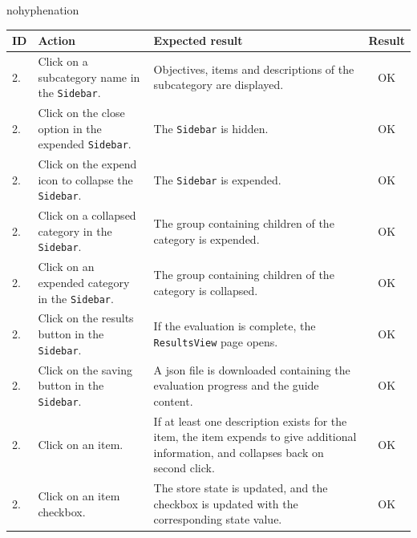 \begin{hyphenrules}{nohyphenation}
	\begin{table}[ht]
		\begin{center}
			\begin{tabularx}{\textwidth}{l|p{4cm}Xc}
				\toprule[0.8mm]
				\textbf{ID} & \textbf{Action} & \textbf{Expected result} & \textbf{Result} \\
				\midrule[0.8mm] 
				\stepcounter{testsappcounter}
				2.\thetestsappcounter & Click on a subcategory name in the \texttt{Sidebar}. & Objectives, items and descriptions of the subcategory are displayed. & \cellcolor{green!25}OK \\
				\midrule 
				\stepcounter{testsappcounter}
				2.\thetestsappcounter & Click on the close option in the expended \texttt{Sidebar}. & The \texttt{Sidebar} is hidden. & \cellcolor{green!25}OK \\
				\midrule 
				\stepcounter{testsappcounter}
				2.\thetestsappcounter & Click on the expend icon to collapse the \texttt{Sidebar}. & The \texttt{Sidebar} is expended. & \cellcolor{green!25}OK \\
				\midrule 
				\stepcounter{testsappcounter}
				2.\thetestsappcounter & Click on a collapsed category in the \texttt{Sidebar}. & The group containing children of the category is expended. & \cellcolor{green!25}OK \\
				\midrule 
				\stepcounter{testsappcounter}
				2.\thetestsappcounter & Click on an expended category in the \texttt{Sidebar}. & The group containing children of the category is collapsed. & \cellcolor{green!25}OK \\
				\midrule 
				\stepcounter{testsappcounter}
				2.\thetestsappcounter & Click on the results button in the \texttt{Sidebar}. & If the evaluation is complete, the \texttt{ResultsView} page opens. & \cellcolor{green!25}OK \\
				\midrule 
				\stepcounter{testsappcounter}
				2.\thetestsappcounter & Click on the saving button in the \texttt{Sidebar}. & A \gls{json} file is downloaded containing the evaluation progress and the guide content. & \cellcolor{green!25}OK \\
				\midrule 
				\stepcounter{testsappcounter}
				2.\thetestsappcounter & Click on an item. & If at least one description exists for the item, the item expends to give additional information, and collapses back on second click. & \cellcolor{green!25}OK \\
				\midrule 
				\stepcounter{testsappcounter}
				2.\thetestsappcounter & Click on an item checkbox. & The store state is updated, and the checkbox is updated with the corresponding state value. & \cellcolor{green!25}OK \\

\end{tabularx}
\end{center}
\end{table}
\end{hyphenrules}
